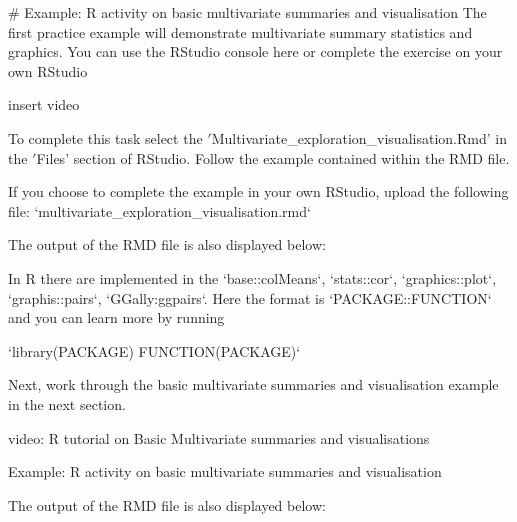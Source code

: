 \documentclass[11pt]{article}
\begin{document}
# Example: R activity on basic multivariate summaries and visualisation
The first practice example will demonstrate multivariate summary statistics and graphics.
You can use the RStudio console here or complete the exercise on your own RStudio

insert video

To complete this task select the \('\)Multivariate\_exploration\_visualisation.Rmd'
in the \('\)Files' section of RStudio.
Follow the example contained within the RMD file.

If you choose to complete the example in your own RStudio, upload the following
file: `multivariate\_exploration\_visualisation.rmd`

The output of the RMD file is also displayed below:

In R there are implemented in the `base::colMeans`, `stats::cor`, `graphics::plot`,
`graphis::pairs`, `GGally:ggpairs`.
Here the format is `PACKAGE::FUNCTION` and you can learn more by running

`library(PACKAGE)
FUNCTION(PACKAGE)`

Next, work through the basic multivariate summaries and visualisation example
in the next section.

video: R tutorial on Basic Multivariate summaries and visualisations

Example: R activity on basic multivariate summaries and visualisation

The output of the RMD file is also displayed below:
\end{document}
